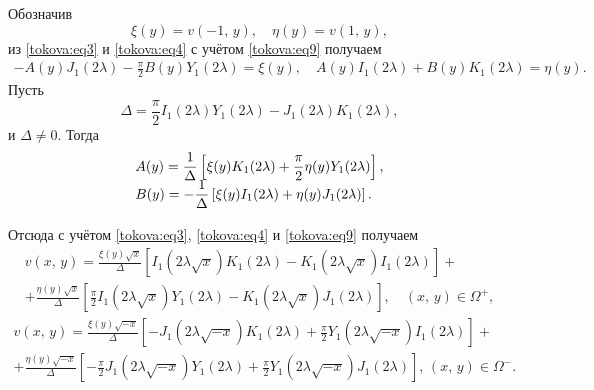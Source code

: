 Обозначив 
\begin{equation}
\label{tokova:eq10}
\xi(y)=v(-1,\,y),\quad \eta(y)=v(1,\,y),
\end{equation}
из \eqref{tokova:eq3} и \eqref{tokova:eq4} с учётом \eqref{tokova:eq9} получаем
\begin{gather*}
-A(y)J_1(2\lambda) - \frac{\pi}{2} B(y)Y_1 (2 \lambda)=\xi(y),\quad 
A(y)I_1 (2\lambda)+ B(y)K_1(2 \lambda)=\eta(y).
\end{gather*}
Пусть
\[
\Delta=\frac{\pi}{2}I_1(2\lambda)Y_1 (2\lambda)-J_1(2 \lambda)K_1 (2\lambda),
\]
и $\Delta \neq 0$. Тогда
\begin{equation}
\label{tokova:eq11}
\begin{array}{l}
\displaystyle A(y)=\frac{1}{\Delta} \left[\xi(y)K_1(2 \lambda)+\frac{\pi}{2}\eta(y)Y_1 (2 \lambda)\right],\\ \vspace{2mm}
\displaystyle B(y)=-\frac{1}{\Delta}\left[\xi(y)I_1(2 \lambda)+\eta(y)J_1(2 \lambda)\right].
\end{array}
\end{equation}
Отсюда с учётом \eqref{tokova:eq3}, \eqref{tokova:eq4} и \eqref{tokova:eq9} получаем
\begin{multline}
\label{tokova:eq12}
v(x,\,y)=\frac{\xi(y)\sqrt x}{\Delta} \left[I_1 (2 \lambda \sqrt{x})K_1 (2 \lambda) - K_1 (2 \lambda \sqrt{x}) I_1 (2 \lambda)\right]+ \\
+\frac{\eta(y)\sqrt x}{\Delta}\left[\frac{\pi}{2} I_1 (2\lambda \sqrt{ x}) Y_1 (2 \lambda) - K_1 (2 \lambda \sqrt{x})J_1 (2 \lambda)\right],
\quad (x,\,y) \in\Omega^{+},
\end{multline}
\begin{multline}
\label{tokova:eq13}
v(x,\,y)=\frac{\xi(y)\sqrt {-x}}{\Delta} \left[-J_1(2 \lambda \sqrt{-x})K_1(2 \lambda)+\frac{\pi}{2} Y_1(2 \lambda \sqrt{-x})I_1(2 \lambda)\right]+ \\
+\frac{\eta(y)\sqrt {-x}}{\Delta} \left[-\frac{\pi}{2} J_1 (2 \lambda \sqrt{-x}) Y_1(2 \lambda)+\frac{\pi}{2} Y_1(2 \lambda \sqrt{-x})J_1(2 \lambda)\right],
\, (x,\,y)\in\Omega^{-}.
\end{multline}

